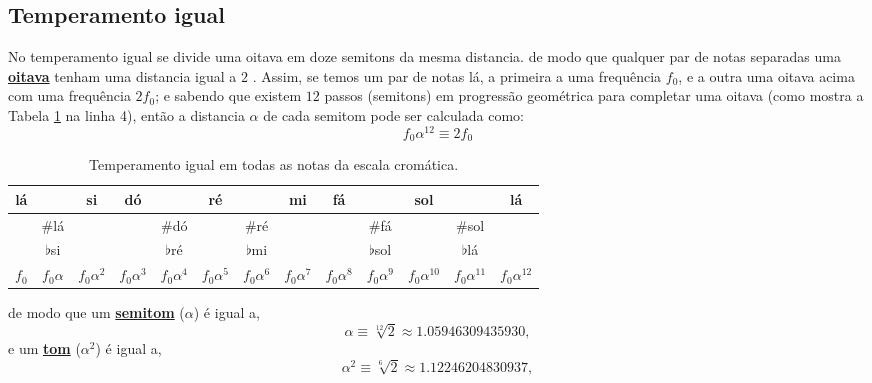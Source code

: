\subsection{Temperamento igual}
\label{subsec:tempigual}
No  temperamento igual se divide uma oitava em doze semitons da mesma distancia.
de modo que qualquer par de notas separadas uma 
\hyperref[sec:pos:Oitava]{\textbf{oitava}} tenham uma distancia igual a $2$ \cite[pp. 835]{apel1969harvard}.
Assim, se temos um par de notas lá, a primeira a uma frequência $f_0$, 
e a outra uma oitava acima com uma frequência $2f_0$;
e sabendo que existem $12$ passos (semitons) em progressão  geométrica para completar uma oitava 
(como mostra a Tabela \ref{tab:temperamento1} na linha 4),
então a distancia $\alpha$ de cada semitom pode ser calculada como:
\begin{equation}
f_0\alpha^{12}\equiv 2 f_0
\end{equation}
\begin{table}
\centering
\begin{tabular}{|c|c|c|c|c|c|c|c|c|c|c|c||c|}
\hline
 lá  & ~ & si  & dó  & ~ & ré  & ~ & mi  & fá  & ~ & sol   & ~ & lá\\ \hline
 ~  & $\#$lá  & ~  & ~  & $\#$dó  & ~  & $\#$ré  & ~  & ~  & $\#$fá  & ~   & $\#$sol   & ~\\ \hline
 ~  & $\flat$si  & ~  & ~  &  $\flat$ré  & ~  &  $\flat$mi  & ~  & ~  &  $\flat$sol  & ~   &  $\flat$lá   & ~\\ \hline
$f_0$ & $f_0\alpha$ & $f_0\alpha^2$ & $f_0\alpha^3$ & $f_0\alpha^4$ & $f_0\alpha^5$ & $f_0\alpha^6$ & $f_0\alpha^7$ & $f_0\alpha^8$ & $f_0\alpha^9$ & $f_0\alpha^{10}$ & $f_0\alpha^{11}$ & $f_0\alpha^{12}$ \\ \hline
\end{tabular}
\caption{Temperamento igual em todas as notas da escala cromática.}
\label{tab:temperamento1}
\end{table}
de modo que um \hyperref[sec:pos:Semitom]{\textbf{semitom}} ($\alpha$) é igual a,
\begin{equation}
\alpha \equiv \sqrt[12]{2} \approx  1.05946309435930,
\end{equation}
e um \hyperref[sec:pos:TomDist]{\textbf{tom}} ($\alpha^2$) é igual a,
\begin{equation}
\alpha^2 \equiv \sqrt[6]{2} \approx  1.12246204830937,
\end{equation}

